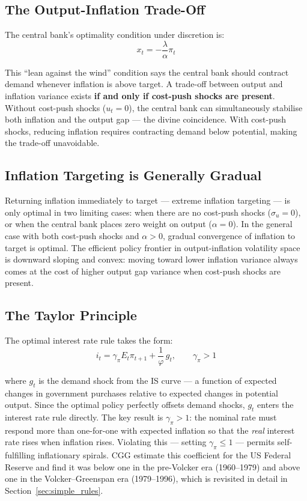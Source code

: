 \documentclass[11pt, a4paper]{article}
\begin{document}
\subsection*{The Output-Inflation Trade-Off}

The central bank's optimality condition under discretion is:
\begin{equation}
    x_t = -\frac{\lambda}{\alpha}\pi_t
\end{equation}

This ``lean against the wind'' condition says the central bank should
contract demand whenever inflation is above target. A trade-off between
output and inflation variance exists \textbf{if and only if cost-push shocks
are present}. Without cost-push shocks ($u_t = 0$), the central bank can
simultaneously stabilise both inflation and the output gap --- the divine
coincidence. With cost-push shocks, reducing inflation requires contracting
demand below potential, making the trade-off unavoidable.

\subsection*{Inflation Targeting is Generally Gradual}

Returning inflation immediately to target --- extreme inflation targeting ---
is only optimal in two limiting cases: when there are no cost-push shocks
($\sigma_u = 0$), or when the central bank places zero weight on output
($\alpha = 0$). In the general case with both cost-push shocks and
$\alpha > 0$, gradual convergence of inflation to target is optimal. The
efficient policy frontier in output-inflation volatility space is downward
sloping and convex: moving toward lower inflation variance always comes at
the cost of higher output gap variance when cost-push shocks are present.

\subsection*{The Taylor Principle}

The optimal interest rate rule takes the form:
\begin{equation}
    i_t = \gamma_\pi E_t\pi_{t+1} + \frac{1}{\varphi}\,g_t,
    \qquad \gamma_\pi > 1
\end{equation}

where $g_t$ is the demand shock from the IS curve --- a function of expected
changes in government purchases relative to expected changes in potential
output. Since the optimal policy perfectly offsets demand shocks, $g_t$
enters the interest rate rule directly. The key result is $\gamma_\pi > 1$:
the nominal rate must respond more than one-for-one with expected inflation
so that the \textit{real} interest rate rises when inflation rises. Violating
this --- setting $\gamma_\pi \leq 1$ --- permits self-fulfilling inflationary
spirals. CGG estimate this coefficient for the US Federal Reserve and find it
was below one in the pre-Volcker era (1960--1979) and above one in the
Volcker--Greenspan era (1979--1996), which is revisited in detail in
Section~\ref{sec:simple_rules}.
\end{document}
